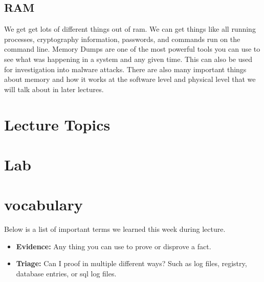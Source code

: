 \documentclass[letterpaper, onecolumn,10pt]{IEEEtran}
\begin{document}
            \subsection{RAM} We get get lots of different things out of ram. We can get things like all running processes, cryptography information, passwords, and commands run on the command line. Memory Dumps are one of the most powerful tools you can use to see what was happening in a system and any given time. This can also be used for investigation into malware attacks. There are also many important things about memory and how it works at the software level and physical level that we will talk about in later lectures.\\  
		
		\section{Lecture Topics}
		
		\section{Lab}

		\section{vocabulary}
		    Below is a list of important terms we learned this week during lecture.\\
		    \begin{itemize}
		        \item \textbf{Evidence: } Any thing you can use to prove or disprove a fact.\\
		        \item \textbf{Triage: } Can I proof in multiple different ways? Such as log files, registry, database entries, or sql log files.\\
		    \end{itemize}
		
\end{document}
